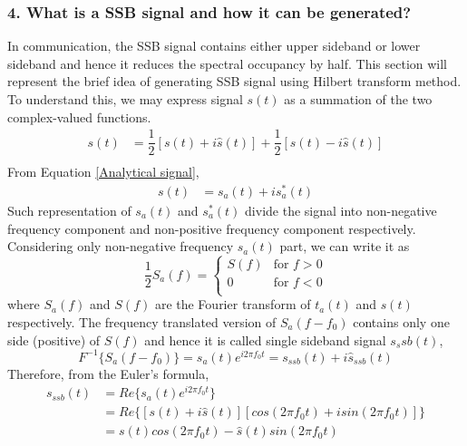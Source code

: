 \subsubsection{4. What is a SSB signal and how it can be generated?}
In communication, the SSB signal contains either upper sideband or lower sideband and hence it reduces the spectral occupancy by half. This section will represent the brief idea of generating SSB signal using Hilbert transform method.\\
To understand this, we may express signal $s(t)$ as a summation of the two complex-valued functions.
\begin{equation}
\begin{split}
s(t)&=\dfrac{1}{2}[s(t)+i\hat{s}(t)]+\dfrac{1}{2}[s(t)-i\hat{s}(t)]\\
\end{split}
\label{}
\end{equation}
From Equation \ref{Analytical signal},
\begin{equation}
\begin{split}
	s(t)&=s_a(t)+i{s_a^*}(t)
\end{split}
\label{}
\end{equation}
Such representation of ${s_a}(t)$ and ${s_a^*}(t)$ divide the signal into non-negative frequency component and non-positive frequency component respectively. Considering only non-negative frequency ${s_a}(t)$ part, we can write it as
\begin{equation}
\dfrac{1}{2}{S_a}(f) = \begin{cases}
S(f) &\text{for $f>0$}\\
0    &\text{for $f<0$}\\
\end{cases}
\end{equation}
where ${S_a}(f)$ and ${S}(f)$ are the Fourier transform of ${t_a}(t)$ and ${s}(t)$ respectively. The frequency translated version of ${S_a}(f-f_0)$ contains only one side (positive) of ${S}(f)$ and hence it is called single sideband signal ${s_ssb}(t)$,
\begin{equation}
{F}^{-1}\{S_a(f-f_0)\}={s_a}(t) e^{i2\pi f_0 t}={s_{ssb}}(t)+i{\hat{s}_{ssb}(t)}
\end{equation}
Therefore, from the Euler's formula,
\begin{equation}
\begin{split}
{s}_{ssb}(t)&=Re\{s_a(t)  e^{i2\pi f_0 t}\}\\
&=Re\{[s(t)+i\hat{s}(t)] [cos(2\pi f_0t)+isin(2\pi f_0t)]\}\\
&=s(t)cos(2\pi f_0t)-\hat{s}(t)sin(2\pi f_0t)
\end{split}
\label{USB_SSB}
\end{equation}
